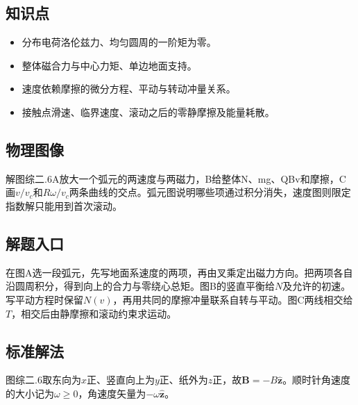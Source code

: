 \documentclass[UTF8,fontset=fandol,a4paper,11pt]{ctexart}
\begin{document}


\subsection*{知识点}

\begin{itemize}
\item 分布电荷洛伦兹力、均匀圆周的一阶矩为零。
\item 整体磁合力与中心力矩、单边地面支持。
\item 速度依赖摩擦的微分方程、平动与转动冲量关系。
\item 接触点滑速、临界速度、滚动之后的零静摩擦及能量耗散。
\end{itemize}



\subsection*{物理图像}

解图综二.6A放大一个弧元的两速度与两磁力，B给整体N、mg、QBv和摩擦，C画$v/v_c$和$R\omega/v_c$两条曲线的交点。弧元图说明哪些项通过积分消失，速度图则限定指数解只能用到首次滚动。



\subsection*{解题入口}

在图A选一段弧元，先写地面系速度的两项，再由叉乘定出磁力方向。把两项各自沿圆周积分，得到向上的合力与零绕心总矩。图B的竖直平衡给$N$及允许的初速。写平动方程时保留$N(v)$，再用共同的摩擦冲量联系自转与平动。图C两线相交给$T$，相交后由静摩擦和滚动约束求运动。



\subsection*{标准解法}


图综二.6取东向为$x$正、竖直向上为$y$正、纸外为$z$正，故$\boldsymbol B=-B\hat{\boldsymbol z}$。顺时针角速度的大小记为$\omega\geq0$，角速度矢量为$-\omega\hat{\boldsymbol z}$。
\end{document}
